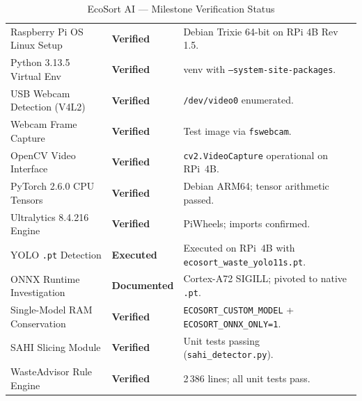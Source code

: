 \documentclass[12pt,a4paper]{article}
\begin{document}
\renewcommand{\arraystretch}{1.32}
\begin{table}[H]
\centering
\caption{EcoSort AI --- Milestone Verification Status}
\label{tab:progress}
\small
\begin{tabularx}{\linewidth}{@{} L{5.4cm} C{2.7cm} X @{}}
\toprule
{} &  &  \\
\midrule
Raspberry Pi OS Linux Setup       & \textcolor{ecosortgreen}{\textbf{Verified}} & Debian Trixie 64-bit on RPi 4B Rev 1.5. \\
Python 3.13.5 Virtual Env         & \textcolor{ecosortgreen}{\textbf{Verified}} & venv with \texttt{--system-site-packages}. \\
USB Webcam Detection (V4L2)       & \textcolor{ecosortgreen}{\textbf{Verified}} & \texttt{/dev/video0} enumerated. \\
Webcam Frame Capture              & \textcolor{ecosortgreen}{\textbf{Verified}} & Test image via \texttt{fswebcam}. \\
OpenCV Video Interface            & \textcolor{ecosortgreen}{\textbf{Verified}} & \texttt{cv2.VideoCapture} operational on RPi~4B. \\
PyTorch 2.6.0 CPU Tensors         & \textcolor{ecosortgreen}{\textbf{Verified}} & Debian ARM64; tensor arithmetic passed. \\
Ultralytics 8.4.216 Engine        & \textcolor{ecosortgreen}{\textbf{Verified}} & PiWheels; imports confirmed. \\
YOLO \texttt{.pt} Detection       & \textcolor{ecosortgreen}{\textbf{Executed}} & Executed on RPi~4B with \texttt{ecosort\_waste\_yolo11s.pt}. \\
ONNX Runtime Investigation        & \textcolor{warnyellow}{\textbf{Documented}} & Cortex-A72 SIGILL; pivoted to native \texttt{.pt}. \\
Single-Model RAM Conservation     & \textcolor{ecosortgreen}{\textbf{Verified}} & \texttt{ECOSORT\_CUSTOM\_MODEL} + \texttt{ECOSORT\_ONNX\_ONLY=1}. \\
SAHI Slicing Module               & \textcolor{ecosortgreen}{\textbf{Verified}} & Unit tests passing (\texttt{sahi\_detector.py}). \\
WasteAdvisor Rule Engine          & \textcolor{ecosortgreen}{\textbf{Verified}} & 2\,386 lines; all unit tests pass. \\

\end{tabularx}
\end{table}
\end{document}
